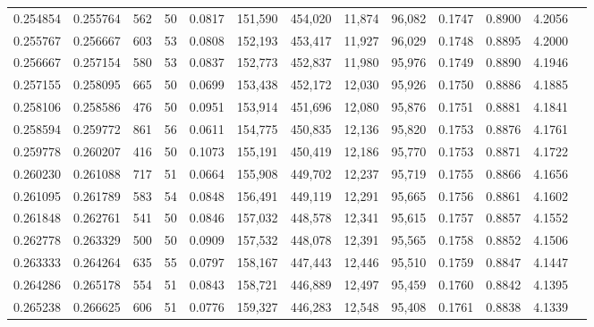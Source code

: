 \begin{tabular}{rrrrrrrrrrrrr}
0.254854 & 0.255764 &    562 &    50 &                                     0.0817 & 151,590 & 454,020 &  11,874 &  96,082 & 0.1747 & 0.8900 & 4.2056 \\
0.255767 & 0.256667 &    603 &    53 &                                     0.0808 & 152,193 & 453,417 &  11,927 &  96,029 & 0.1748 & 0.8895 & 4.2000 \\
0.256667 & 0.257154 &    580 &    53 &                                     0.0837 & 152,773 & 452,837 &  11,980 &  95,976 & 0.1749 & 0.8890 & 4.1946 \\
0.257155 & 0.258095 &    665 &    50 &                                     0.0699 & 153,438 & 452,172 &  12,030 &  95,926 & 0.1750 & 0.8886 & 4.1885 \\
0.258106 & 0.258586 &    476 &    50 &                                     0.0951 & 153,914 & 451,696 &  12,080 &  95,876 & 0.1751 & 0.8881 & 4.1841 \\
0.258594 & 0.259772 &    861 &    56 &                                     0.0611 & 154,775 & 450,835 &  12,136 &  95,820 & 0.1753 & 0.8876 & 4.1761 \\
0.259778 & 0.260207 &    416 &    50 &                                     0.1073 & 155,191 & 450,419 &  12,186 &  95,770 & 0.1753 & 0.8871 & 4.1722 \\
0.260230 & 0.261088 &    717 &    51 &                                     0.0664 & 155,908 & 449,702 &  12,237 &  95,719 & 0.1755 & 0.8866 & 4.1656 \\
0.261095 & 0.261789 &    583 &    54 &                                     0.0848 & 156,491 & 449,119 &  12,291 &  95,665 & 0.1756 & 0.8861 & 4.1602 \\
0.261848 & 0.262761 &    541 &    50 &                                     0.0846 & 157,032 & 448,578 &  12,341 &  95,615 & 0.1757 & 0.8857 & 4.1552 \\
0.262778 & 0.263329 &    500 &    50 &                                     0.0909 & 157,532 & 448,078 &  12,391 &  95,565 & 0.1758 & 0.8852 & 4.1506 \\
0.263333 & 0.264264 &    635 &    55 &                                     0.0797 & 158,167 & 447,443 &  12,446 &  95,510 & 0.1759 & 0.8847 & 4.1447 \\
0.264286 & 0.265178 &    554 &    51 &                                     0.0843 & 158,721 & 446,889 &  12,497 &  95,459 & 0.1760 & 0.8842 & 4.1395 \\
0.265238 & 0.266625 &    606 &    51 &                                     0.0776 & 159,327 & 446,283 &  12,548 &  95,408 & 0.1761 & 0.8838 & 4.1339 \\

\end{tabular}

